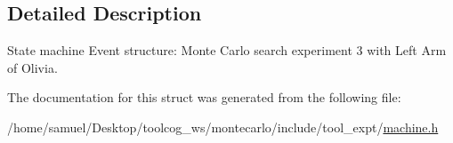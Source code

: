 \subsection{Detailed Description}
State machine Event structure\+: Monte Carlo search experiment 3 with Left Arm of Olivia. 

The documentation for this struct was generated from the following file\+:\begin{DoxyCompactItemize}
\item 
/home/samuel/\+Desktop/toolcog\+\_\+ws/montecarlo/include/tool\+\_\+expt/\hyperlink{machine_8h}{machine.\+h}\end{DoxyCompactItemize}
